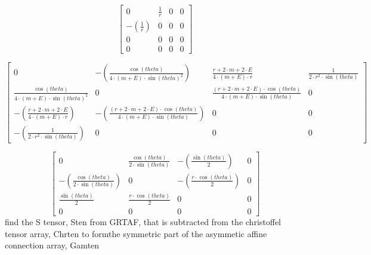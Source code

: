 \documentclass[fleqn]{article}
\begin{document}
\[\tag{\% o81} 
\begin{bmatrix}0 & \frac{1}{r} & 0 & 0\\
\mathop{-}\left( \frac{1}{r}\right)  & 0 & 0 & 0\\
0 & 0 & 0 & 0\\
0 & 0 & 0 & 0\end{bmatrix}\mbox{}\]

\[\tag{\% o82} 
\begin{bmatrix}0 & \mathop{-}\left( \frac{\cos{(theta)}}{4\mathop{\ensuremath{\cdot}}\left( m\mathop{+}E\right) \mathop{\ensuremath{\cdot}}{{\sin{(theta)}}^{2}}}\right)  & \frac{r\mathop{+}2\mathop{\ensuremath{\cdot}}m\mathop{+}2\mathop{\ensuremath{\cdot}}E}{4\mathop{\ensuremath{\cdot}}\left( m\mathop{+}E\right) \mathop{\ensuremath{\cdot}}r} & \frac{1}{2\mathop{\ensuremath{\cdot}}{{r}^{2}}\mathop{\ensuremath{\cdot}}\sin{(theta)}}\\
\frac{\cos{(theta)}}{4\mathop{\ensuremath{\cdot}}\left( m\mathop{+}E\right) \mathop{\ensuremath{\cdot}}{{\sin{(theta)}}^{2}}} & 0 & \frac{\left( r\mathop{+}2\mathop{\ensuremath{\cdot}}m\mathop{+}2\mathop{\ensuremath{\cdot}}E\right) \mathop{\ensuremath{\cdot}}\cos{(theta)}}{4\mathop{\ensuremath{\cdot}}\left( m\mathop{+}E\right) \mathop{\ensuremath{\cdot}}\sin{(theta)}} & 0\\
\mathop{-}\left( \frac{r\mathop{+}2\mathop{\ensuremath{\cdot}}m\mathop{+}2\mathop{\ensuremath{\cdot}}E}{4\mathop{\ensuremath{\cdot}}\left( m\mathop{+}E\right) \mathop{\ensuremath{\cdot}}r}\right)  & \mathop{-}\left( \frac{\left( r\mathop{+}2\mathop{\ensuremath{\cdot}}m\mathop{+}2\mathop{\ensuremath{\cdot}}E\right) \mathop{\ensuremath{\cdot}}\cos{(theta)}}{4\mathop{\ensuremath{\cdot}}\left( m\mathop{+}E\right) \mathop{\ensuremath{\cdot}}\sin{(theta)}}\right)  & 0 & 0\\
\mathop{-}\left( \frac{1}{2\mathop{\ensuremath{\cdot}}{{r}^{2}}\mathop{\ensuremath{\cdot}}\sin{(theta)}}\right)  & 0 & 0 & 0\end{bmatrix}\mbox{}\]

\[\tag{\% o83} 
\begin{bmatrix}0 & \frac{\cos{(theta)}}{2\mathop{\ensuremath{\cdot}}\sin{(theta)}} & \mathop{-}\left( \frac{\sin{(theta)}}{2}\right)  & 0\\
\mathop{-}\left( \frac{\cos{(theta)}}{2\mathop{\ensuremath{\cdot}}\sin{(theta)}}\right)  & 0 & \mathop{-}\left( \frac{r\mathop{\ensuremath{\cdot}}\cos{(theta)}}{2}\right)  & 0\\
\frac{\sin{(theta)}}{2} & \frac{r\mathop{\ensuremath{\cdot}}\cos{(theta)}}{2} & 0 & 0\\
0 & 0 & 0 & 0\end{bmatrix}\mbox{}
\]
find the S tensor, Sten from GRTAF, that is subtracted from the christoffel tensor array, Chrten to formthe symmetric part of the asymmetic affine connection array, Gamten
\end{document}
